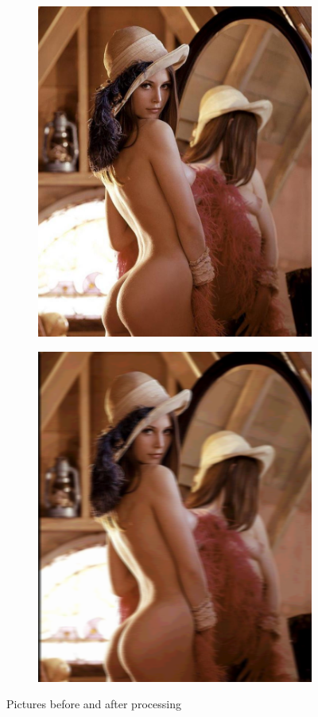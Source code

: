 \begin{figure}[htb!]
\begin{subfigure}[c]{0.5\linewidth}
\centering
\includegraphics[clip, trim=0 0mm 0 0,width=0.8\linewidth]{./midterm/img/lena_full.png}
\end{subfigure}
\begin{subfigure}[c]{0.5\linewidth}
\centering
\includegraphics[clip, trim=0 0mm 0 0,width=0.8\linewidth]{./midterm/img/lena_blurry.png}
\end{subfigure}

\caption{Pictures before and after processing}
\end{figure}

